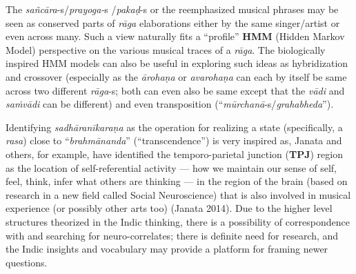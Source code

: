 The \textsl{sañcāra}-s/\textsl{prayoga-}s
/\textsl{pakaḍ}-s or the reemphasized musical phrases may be seen as conserved parts of \textsl{rāga} elaborations either by the same singer/artist or even across many. Such a view naturally fits a “profile” \textbf{HMM} (Hidden Markov Model) perspective on the various musical traces of a \textsl{rāga}. The biologically inspired HMM models can also be useful in exploring such ideas as hybridization and crossover (especially as the \textsl{ārohaṇa} or \textsl{avarohaṇa} can each by itself be same across two different \textsl{rāga}-s; both can even also be same except that the \textsl{vādi} and \textsl{saṁvādi} can be different) and even transposition (“\hbox{\textsl{mūrchanā}-s}/\textsl{grahabheda}”).

Identifying \textsl{sadhāranīkaraṇa} as the operation for realizing a state (specifically, a \textsl{rasa}) close to “\textsl{brahmānanda}” (“transcendence”) is very inspired as, Janata and others, for example, have identified the temporo-parietal junction (\textbf{TPJ}) region as the location of self-referential activity — how we maintain our sense of self, feel, think, infer what others are thinking --- in the region of the brain (based on research in a new field called Social Neuroscience) that is also involved in musical experience (or possibly other arts too) (Janata 2014). Due to the higher level structures theorized in the Indic thinking, there is a possibility of correspondence with and searching for neuro-correlates; there is definite need for research, and the Indic insights and vocabulary may provide a platform for framing newer questions.

